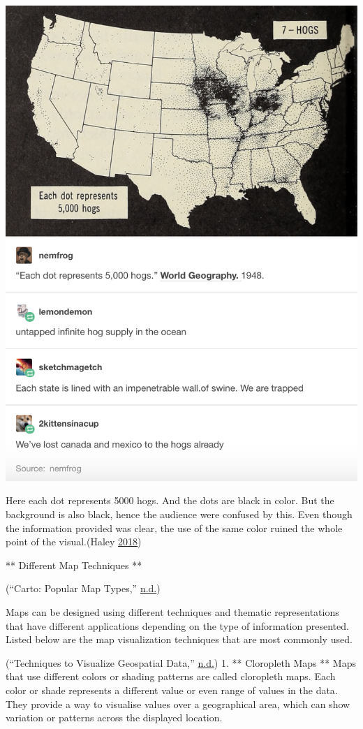 \documentclass[]{book}
\begin{document}
\includegraphics{images/map_hogs.png}

Here each dot represents 5000 hogs. And the dots are black in color. But the background is also black, hence the audience were confused by this. Even though the information provided was clear, the use of the same color ruined the whole point of the visual.(Haley \protect\hyperlink{ref-good_bad_maps_tips}{2018})

** Different Map Techniques **

(``Carto: Popular Map Types,'' \protect\hyperlink{ref-Popular_Map_Types1}{n.d.})

Maps can be designed using different techniques and thematic representations that have different applications depending on the type of information presented. Listed below are the map visualization techniques that are most commonly used.

(``Techniques to Visualize Geospatial Data,'' \protect\hyperlink{ref-Popular_Map_Types2}{n.d.})
1. ** Cloropleth Maps **
Maps that use different colors or shading patterns are called cloropleth maps. Each color or shade represents a different value or even range of values in the data. They provide a way to visualise values over a geographical area, which can show variation or patterns across the displayed location.
\end{document}
